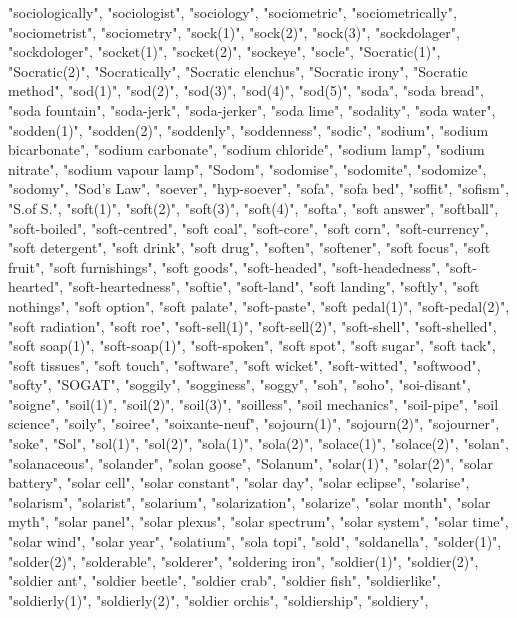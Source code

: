 "sociologically",
"sociologist",
"sociology",
"sociometric",
"sociometrically",
"sociometrist",
"sociometry",
"sock(1)",
"sock(2)",
"sock(3)",
"sockdolager",
"sockdologer",
"socket(1)",
"socket(2)",
"sockeye",
"socle",
"Socratic(1)",
"Socratic(2)",
"Socratically",
"Socratic elenchus",
"Socratic irony",
"Socratic method",
"sod(1)",
"sod(2)",
"sod(3)",
"sod(4)",
"sod(5)",
"soda",
"soda bread",
"soda fountain",
"soda-jerk",
"soda-jerker",
"soda lime",
"sodality",
"soda water",
"sodden(1)",
"sodden(2)",
"soddenly",
"soddenness",
"sodic",
"sodium",
"sodium bicarbonate",
"sodium carbonate",
"sodium chloride",
"sodium lamp",
"sodium nitrate",
"sodium vapour lamp",
"Sodom",
"sodomise",
"sodomite",
"sodomize",
"sodomy",
"Sod's Law",
"soever",
"hyp-soever",
"sofa",
"sofa bed",
"soffit",
"sofism",
"S.of S.",
"soft(1)",
"soft(2)",
"soft(3)",
"soft(4)",
"softa",
"soft answer",
"softball",
"soft-boiled",
"soft-centred",
"soft coal",
"soft-core",
"soft corn",
"soft-currency",
"soft detergent",
"soft drink",
"soft drug",
"soften",
"softener",
"soft focus",
"soft fruit",
"soft furnishings",
"soft goods",
"soft-headed",
"soft-headedness",
"soft-hearted",
"soft-heartedness",
"softie",
"soft-land",
"soft landing",
"softly",
"soft nothings",
"soft option",
"soft palate",
"soft-paste",
"soft pedal(1)",
"soft-pedal(2)",
"soft radiation",
"soft roe",
"soft-sell(1)",
"soft-sell(2)",
"soft-shell",
"soft-shelled",
"soft soap(1)",
"soft-soap(1)",
"soft-spoken",
"soft spot",
"soft sugar",
"soft tack",
"soft tissues",
"soft touch",
"software",
"soft wicket",
"soft-witted",
"softwood",
"softy",
"SOGAT",
"soggily",
"sogginess",
"soggy",
"soh",
"soho",
"soi-disant",
"soigne",
"soil(1)",
"soil(2)",
"soil(3)",
"soilless",
"soil mechanics",
"soil-pipe",
"soil science",
"soily",
"soiree",
"soixante-neuf",
"sojourn(1)",
"sojourn(2)",
"sojourner",
"soke",
"Sol",
"sol(1)",
"sol(2)",
"sola(1)",
"sola(2)",
"solace(1)",
"solace(2)",
"solan",
"solanaceous",
"solander",
"solan goose",
"Solanum",
"solar(1)",
"solar(2)",
"solar battery",
"solar cell",
"solar constant",
"solar day",
"solar eclipse",
"solarise",
"solarism",
"solarist",
"solarium",
"solarization",
"solarize",
"solar month",
"solar myth",
"solar panel",
"solar plexus",
"solar spectrum",
"solar system",
"solar time",
"solar wind",
"solar year",
"solatium",
"sola topi",
"sold",
"soldanella",
"solder(1)",
"solder(2)",
"solderable",
"solderer",
"soldering iron",
"soldier(1)",
"soldier(2)",
"soldier ant",
"soldier beetle",
"soldier crab",
"soldier fish",
"soldierlike",
"soldierly(1)",
"soldierly(2)",
"soldier orchis",
"soldiership",
"soldiery",
